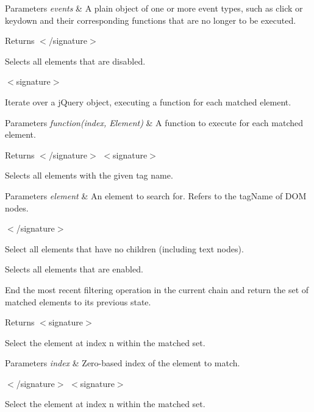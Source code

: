 \begin{DoxyParams}{Parameters}
{\em events} & A plain object of one or more event types, such as click or keydown and their corresponding functions that are no longer to be executed.\\
\hline
\end{DoxyParams}
\begin{DoxyReturn}{Returns}
$<$/signature$>$ 

Selects all elements that are disabled.
\end{DoxyReturn}
$<$signature$>$ 

Iterate over a j\-Query object, executing a function for each matched element.


\begin{DoxyParams}{Parameters}
{\em function(index, Element)} & A function to execute for each matched element.\\
\hline
\end{DoxyParams}
\begin{DoxyReturn}{Returns}
$<$/signature$>$ $<$signature$>$ 

Selects all elements with the given tag name.
\end{DoxyReturn}

\begin{DoxyParams}{Parameters}
{\em element} & An element to search for. Refers to the tag\-Name of D\-O\-M nodes.\\
\hline
\end{DoxyParams}
$<$/signature$>$ 

Select all elements that have no children (including text nodes).

Selects all elements that are enabled.

End the most recent filtering operation in the current chain and return the set of matched elements to its previous state.

\begin{DoxyReturn}{Returns}
$<$signature$>$ 

Select the element at index n within the matched set.
\end{DoxyReturn}

\begin{DoxyParams}{Parameters}
{\em index} & Zero-\/based index of the element to match.\\
\hline
\end{DoxyParams}
$<$/signature$>$ $<$signature$>$ 

Select the element at index n within the matched set.


